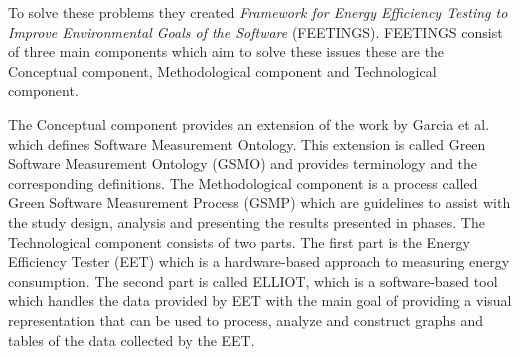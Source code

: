 To solve these problems they created \textit{Framework for Energy Efficiency Testing to Improve Environmental Goals of the Software} (FEETINGS). FEETINGS consist of three main components which aim to solve these issues these are the Conceptual component, Methodological component and Technological component.\cite{MANCEBO2021100558}\nytafsnit

%

The Conceptual component provides an extension of the work by Garcia et al.\cite{GARCIA2006631} which defines Software Measurement Ontology. This extension is called Green Software Measurement Ontology (GSMO) and provides terminology and the corresponding definitions. The Methodological component is a process called Green Software Measurement Process (GSMP) which are guidelines to assist with the study design, analysis and presenting the results presented in phases. The Technological component consists of two parts. The first part is the Energy Efficiency Tester (EET) which is a hardware-based approach to measuring energy consumption. The second part is called ELLIOT, which is a software-based tool which handles the data provided by EET with the main goal of providing a visual representation that can be used to process, analyze and construct graphs and tables of the data collected by the EET.\cite{MANCEBO2021100558}


